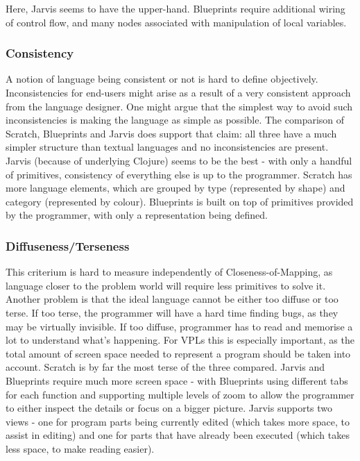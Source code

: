\documentclass[11pt]{scrartcl}
\begin{document}
Here, Jarvis seems to have the upper-hand.
Blueprints require additional wiring of control flow, and many nodes associated
with manipulation of local variables.

\subsubsection{Consistency}
A notion of language being consistent or not is hard to define objectively.
Inconsistencies for end-users might arise as a result of a very consistent
approach from the language designer.
One might argue that the simplest way to avoid such inconsistencies is making
the language as simple as possible.
The comparison of Scratch, Blueprints and Jarvis does support that claim: all
three have a much simpler structure than textual languages and no
inconsistencies are present.
Jarvis (because of underlying Clojure) seems to be the best - with only a
handful of primitives, consistency of everything else is up to the programmer.
Scratch has more language elements, which are grouped by type (represented by
shape) and category (represented by colour).
Blueprints is built on top of primitives provided by the programmer, with only a
representation being defined.

\subsubsection{Diffuseness/Terseness}
This criterium is hard to measure independently of Closeness-of-Mapping, as
language closer to the problem world will require less primitives to solve it.
Another problem is that the ideal language cannot be either too diffuse or too
terse.
If too terse, the programmer will have a hard time finding bugs, as they may be
virtually invisible.
If too diffuse, programmer has to read and memorise a lot to understand what’s
happening.
For VPLs this is especially important, as the total amount of screen space
needed to represent a program should be taken into account.
Scratch is by far the most terse of the three compared.
Jarvis and Blueprints require much more screen space - with Blueprints using
different tabs for each function and supporting multiple levels of zoom to allow
the programmer to either inspect the details or focus on a bigger picture.
Jarvis supports two views - one for program parts being currently edited (which
takes more space, to assist in editing) and one for parts that have already been
executed (which takes less space, to make reading easier).
\end{document}
